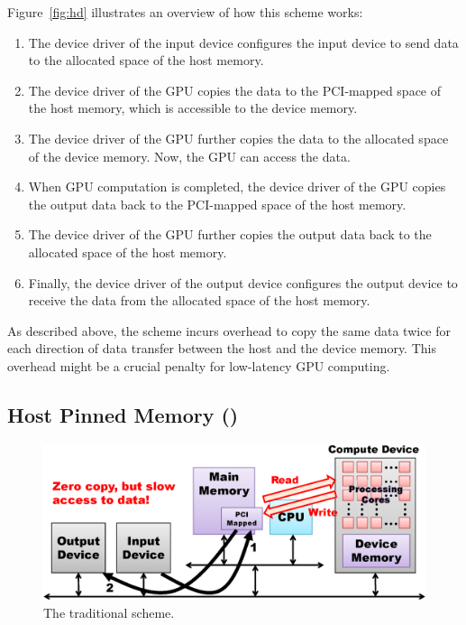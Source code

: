 Figure~\ref{fig:hd} illustrates an overview of how this scheme works:
\begin{enumerate} \itemsep1pt
 \item The device driver of the input device configures the input device
       to send data to the allocated space of the host memory.
 \item The device driver of the GPU copies the data to the
       PCI-mapped space of the host memory, which is accessible to the
       device memory.
 \item The device driver of the GPU further copies the data to the
       allocated space of the device memory.
       Now, the GPU can access the data.
 \item When GPU computation is completed, the device driver of the
       GPU copies the output data back to the PCI-mapped space of the
       host memory.
 \item The device driver of the GPU further copies the output data back
       to the allocated space of the host memory.
 \item Finally, the device driver of the output device configures the
       output device to receive the data from the allocated space of the
       host memory.
\end{enumerate}

As described above, the {\hd} scheme incurs overhead to copy the same
data twice for each direction of data transfer between the host and the
device memory.
This overhead might be a crucial penalty for low-latency GPU computing.

\subsection{Host Pinned Memory ({\hp})}
\label{sec:hp}

\begin{figure}[!t]
 \centering
 \includegraphics[width=\hsize]{eps/hp2.eps}
 \caption{The traditional {\hp} scheme.}
 \label{fig:hp}
\end{figure}

